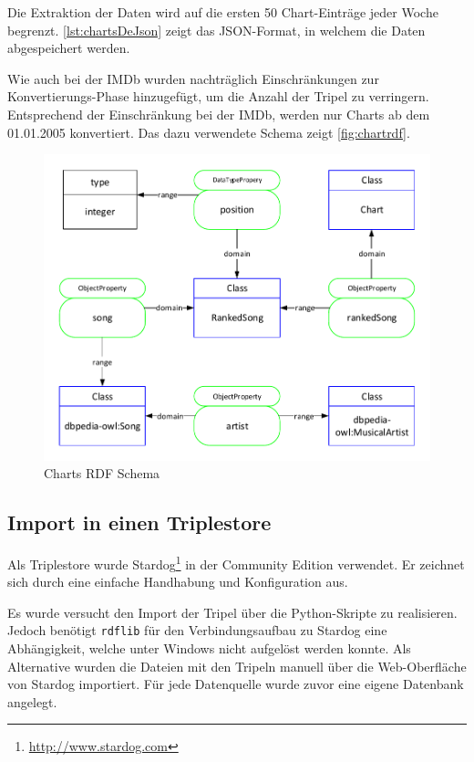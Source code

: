 \documentclass[parskip]{scrartcl}
\begin{document}
Die Extraktion der Daten wird auf die ersten 50 Chart-Einträge jeder Woche begrenzt. \autoref{lst:chartsDeJson} zeigt das JSON-Format, in welchem die Daten abgespeichert werden.



Wie auch bei der IMDb wurden nachträglich Einschränkungen zur Konvertierungs-Phase hinzugefügt, um die Anzahl der Tripel zu verringern. Entsprechend der Einschränkung bei der IMDb, werden nur Charts ab dem 01.01.2005 konvertiert. Das dazu verwendete Schema zeigt \autoref{fig:chartrdf}.

\begin{figure}[H]
    \centering
    \includegraphics[scale=0.8]{charts}
    \caption{Charts RDF Schema}
    \label{fig:chartrdf}
\end{figure}

\subsection{Import in einen Triplestore}

Als Triplestore wurde Stardog\footnote{\url{http://www.stardog.com}} in der Community Edition verwendet. Er zeichnet sich durch eine einfache Handhabung und Konfiguration aus.

Es wurde versucht den Import der Tripel über die Python-Skripte zu realisieren. Jedoch benötigt \texttt{rdflib} für den Verbindungsaufbau zu Stardog eine Abhängigkeit, welche unter Windows nicht aufgelöst werden konnte. Als Alternative wurden die Dateien mit den Tripeln manuell über die Web-Oberfläche von Stardog importiert. Für jede Datenquelle wurde zuvor eine eigene Datenbank angelegt.
\end{document}
